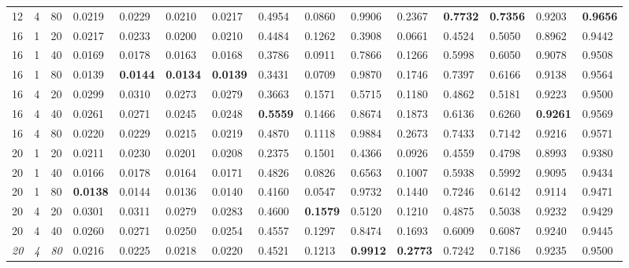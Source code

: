 \documentclass[a4paper,fleqn]{cas-dc}
\begin{document}
\begin{table}
{\begin{tabular}{lllllllllllllll}
12 & 4 & 80 & 0.0219 & 0.0229 & 0.0210 & 0.0217 & 0.4954 & 0.0860 & 0.9906 & 0.2367 & \textbf{0.7732} & \textbf{0.7356} & 0.9203 & \textbf{0.9656} \\
16 & 1 & 20 & 0.0217 & 0.0233 & 0.0200 & 0.0210 & 0.4484 & 0.1262 & 0.3908 & 0.0661 & 0.4524 & 0.5050 & 0.8962 & 0.9442 \\
16 & 1 & 40 & 0.0169 & 0.0178 & 0.0163 & 0.0168 & 0.3786 & 0.0911 & 0.7866 & 0.1266 & 0.5998 & 0.6050 & 0.9078 & 0.9508 \\
16 & 1 & 80 & 0.0139 & \textbf{0.0144} & \textbf{0.0134} & \textbf{0.0139} & 0.3431 & 0.0709 & 0.9870 & 0.1746 & 0.7397 & 0.6166 & 0.9138 & 0.9564 \\
16 & 4 & 20 & 0.0299 & 0.0310 & 0.0273 & 0.0279 & 0.3663 & 0.1571 & 0.5715 & 0.1180 & 0.4862 & 0.5181 & 0.9223 & 0.9500 \\
16 & 4 & 40 & 0.0261 & 0.0271 & 0.0245 & 0.0248 & \textbf{0.5559} & 0.1466 & 0.8674 & 0.1873 & 0.6136 & 0.6260 & \textbf{0.9261} & 0.9569 \\
16 & 4 & 80 & 0.0220 & 0.0229 & 0.0215 & 0.0219 & 0.4870 & 0.1118 & 0.9884 & 0.2673 & 0.7433 & 0.7142 & 0.9216 & 0.9571 \\
20 & 1 & 20 & 0.0211 & 0.0230 & 0.0201 & 0.0208 & 0.2375 & 0.1501 & 0.4366 & 0.0926 & 0.4559 & 0.4798 & 0.8993 & 0.9380 \\
20 & 1 & 40 & 0.0166 & 0.0178 & 0.0164 & 0.0171 & 0.4826 & 0.0826 & 0.6563 & 0.1007 & 0.5938 & 0.5992 & 0.9095 & 0.9434 \\
20 & 1 & 80 & \textbf{0.0138} & 0.0144 & 0.0136 & 0.0140 & 0.4160 & 0.0547 & 0.9732 & 0.1440 & 0.7246 & 0.6142 & 0.9114 & 0.9471 \\
20 & 4 & 20 & 0.0301 & 0.0311 & 0.0279 & 0.0283 & 0.4600 & \textbf{0.1579} & 0.5120 & 0.1210 & 0.4875 & 0.5038 & 0.9232 & 0.9429 \\
20 & 4 & 40 & 0.0260 & 0.0271 & 0.0250 & 0.0254 & 0.4557 & 0.1297 & 0.8474 & 0.1693 & 0.6009 & 0.6087 & 0.9240 & 0.9445 \\
\textit{20} & \textit{4} & \textit{80} & 0.0216 & 0.0225 & 0.0218 & 0.0220 & 0.4521 & 0.1213 & \textbf{0.9912} & \textbf{0.2773} & 0.7242 & 0.7186 & 0.9235 & 0.9500 \\
\bottomrule
\end{tabular}%
}
\end{table}
\end{document}
